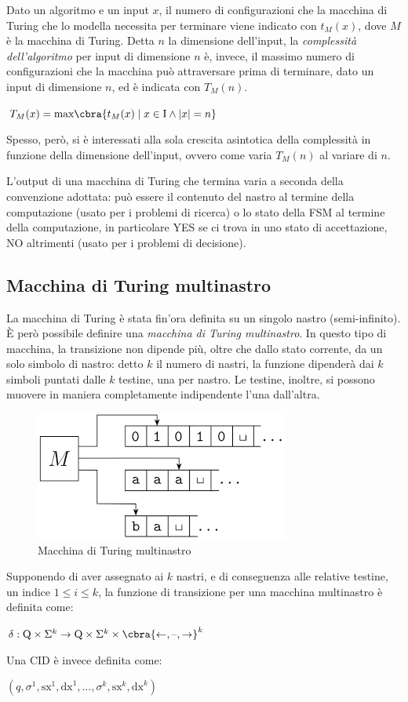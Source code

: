 Dato un algoritmo e un input $x$, il numero di configurazioni che la macchina
di Turing che lo modella necessita per terminare viene indicato con $t_M (x)$,
dove $M$ è la macchina di Turing.
Detta $n$ la dimensione dell'input, la \textit{complessità dell'algoritmo}
per input di dimensione $n$ è, invece, il massimo numero di configurazioni che
la macchina può attraversare prima di terminare, dato un input di
dimensione $n$, ed è indicata con $T_M (n)$.
\begin{center}
    $T_M(x) = \textrm{max} \cbra{ t_M(x) \; | \; x \in \textrm{I} \land |x|=n }$
\end{center}
Spesso, però, si è interessati alla sola crescita asintotica della complessità
in funzione della dimensione dell'input, ovvero come varia $T_M (n)$ al
variare di $n$.

L'output di una macchina di Turing che termina varia a seconda della
convenzione adottata: può essere il contenuto del nastro al termine
della computazione (usato per i problemi di ricerca) o lo stato della FSM
al termine della computazione, in particolare YES se ci trova in uno stato
di accettazione, NO altrimenti (usato per i problemi di decisione).

\subsection{Macchina di Turing multinastro}
La macchina di Turing è stata fin'ora definita su un singolo nastro
(semi-infinito).
È però possibile definire una \textit{macchina di Turing multinastro}.
In questo tipo di macchina, la transizione non dipende più, oltre che
dallo stato corrente, da un solo simbolo di nastro: detto $k$ il numero di
nastri, la funzione dipenderà dai $k$ simboli puntati dalle $k$ testine,
una per nastro. Le testine, inoltre, si possono muovere in maniera
completamente indipendente l'una dall'altra.
\begin{figure}[h]
    \centering
    \includegraphics[width=0.5\linewidth]{img/multitape_turing_machine.png}
    \caption{Macchina di Turing multinastro}
    \label{fig:multitape-turing-machine}
\end{figure}
Supponendo di aver assegnato ai $k$ nastri, e di conseguenza alle relative
testine, un indice $1 \le i \le k$, la funzione di transizione per
una macchina multinastro è definita come:
\begin{center}
    $\delta: \textrm{Q} \times \Sigma^k \rightarrow
    \textrm{Q} \times \Sigma^k \times
    \cbra{ \leftarrow, \textrm{\textendash}, \rightarrow }^k$
\end{center}
Una CID è invece definita come:
\begin{center}
    $(q, \sigma^1, \textrm{sx}^1, \textrm{dx}^1, \ldots,
    \sigma^k, \textrm{sx}^k, \textrm{dx}^k)$
\end{center}

